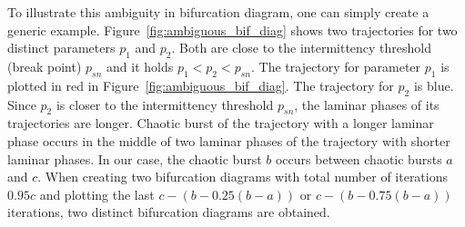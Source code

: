 To illustrate this ambiguity in bifurcation diagram, one can simply create a generic example.
Figure~\ref{fig:ambiguous_bif_diag} shows two trajectories for two distinct parameters $p_1$ and $p_2$.
Both are close to the intermittency threshold (break point) $p_{sn}$ and it holds $p_1 < p_2 < p_{sn}$.
The trajectory for parameter $p_1$ is plotted in red in Figure~\ref{fig:ambiguous_bif_diag}.
The trajectory for $p_2$ is blue.
Since $p_2$ is closer to the intermittency threshold $p_{sn}$, the laminar phases of its trajectories are longer.
Chaotic burst of the trajectory with a longer laminar phase occurs in the middle of two laminar phases of the trajectory with shorter laminar phases.
In our case, the chaotic burst $b$ occurs between chaotic bursts $a$ and $c$.
When creating two bifurcation diagrams with total number of iterations $0.95 c$ and plotting the last $c-(b-0.25(b-a))$ or $c-(b-0.75(b-a))$ iterations, two distinct bifurcation diagrams are obtained.

